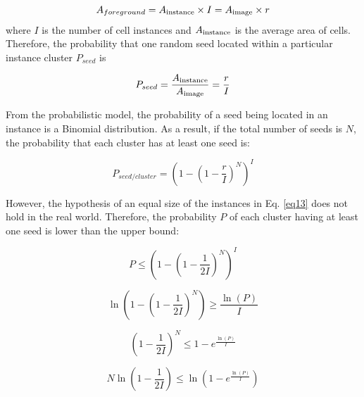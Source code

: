 \documentclass[journal,twoside,web]{ieeecolor}
\begin{document}
\begin{equation}
{A_{foreground}} = A_{{\rm{instance}}} \times I = A_{\rm{image}} \times r
\label{eq12}
\end{equation} where $I$ is the number of cell instances and $A_{{\rm{instance}}}$ is the average area of cells. Therefore, the probability that one random seed located within a particular instance cluster $P_{seed}$ is 

\begin{equation}
P_{seed} = \frac{{{A_{\rm{instance}}}}}{{{A_{{\rm{image}}}}}} =  \frac{r}{I}
\label{eq13}
\end{equation}

From the probabilistic model, the probability of a seed being located in an instance is a Binomial distribution. As a result, if the total number of seeds is $N$, the probability that each cluster has at least one seed is:

\begin{equation}
P_{seed/cluster} = {\left( {1 - {{\left( {1 - \frac{r}{{I}}} \right)}^N}} \right)^I}
\label{eq14}
\end{equation}


However, the hypothesis of an equal size of the instances in Eq. \eqref{eq13} does not hold in the real world. Therefore, the probability $P$ of each cluster having at least one seed is lower than the upper bound:

\begin{equation}
P \le {\left( {1 - {{\left( {1 - \frac{1}{{2I}}} \right)}^N}} \right)^I} 
\label{eq15}
\end{equation}

\begin{equation}\label{eq16}
\ln \left( {1 - {{\left( {1 - \frac{1}{{2I}}} \right)}^N}} \right) \ge \frac{{\ln (P)}}{I}
\end{equation}

\begin{equation}\label{eq17}
{\left( {1 - \frac{1}{{2I}}} \right)^N} \le 1 - {e^{\frac{{\ln (P)}}{I}}}
\end{equation}

\begin{equation}\label{eq18}
N\ln \left( {1 - \frac{1}{{2I}}} \right) \le \ln \left( {1 - {e^{\frac{{\ln (P)}}{I}}}} \right)
\end{equation}
\end{document}
